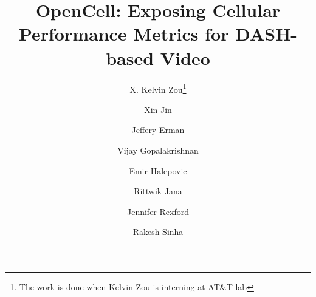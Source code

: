 \documentclass{sig-alternate-10pt}
\begin{document}
\title{OpenCell: Exposing Cellular Performance Metrics for DASH-based Video}
\author[1]{\large X. Kelvin Zou\thanks{The work is done when Kelvin Zou is interning at AT\&T lab} }
\author[1]{\large Xin Jin}
\author[2]{\large Jeffery Erman}
\author[2]{\large Vijay Gopalakrishnan}
\author[2]{\large Emir Halepovic}
\author[2]{\large Rittwik Jana}
\author[1]{\large Jennifer Rexford}
\author[2]{\large Rakesh Sinha}
 
 


\maketitle








 
 

{\small
} 
\end{document}
